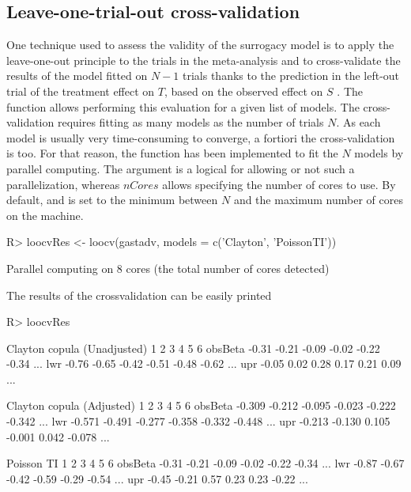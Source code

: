 \documentclass[article,shortnames, nojss]{jss}\usepackage[]{graphicx}\usepackage[]{color}
\begin{document}
\subsection{Leave-one-trial-out cross-validation}
One technique used to assess the validity of the surrogacy model
  is to apply the leave-one-out principle to the trials in the meta-analysis
  and to cross-validate the results of the model fitted on
  $N-1$ trials thanks to the prediction in the left-out trial
  of the treatment effect on $T$, based on the observed effect on $S$
\citep{Michiels09, Mauguen13, Rotolo17}.
The function  allows performing this evaluation for
  a given list of models.
The cross-validation requires fitting as many models as the number of trials $N$.
As each model is usually very time-consuming to converge,
  a fortiori the cross-validation is too.
For that reason, the function  has been implemented to
  fit the $N$ models by parallel computing.
The argument  is a logical for allowing or not such a parallelization,
  whereas $nCores$ allows specifying the number of cores to use.
By default,  and  is set to the minimum
  between $N$ and the maximum number of cores on the machine.
\begin{Schunk}
\begin{Sinput}
R>   loocvRes <- loocv(gastadv, models = c('Clayton', 'PoissonTI'))
\end{Sinput}
\begin{Soutput}
Parallel computing on 8 cores (the total number of cores detected)
\end{Soutput}
\end{Schunk}
The results of the crossvalidation can be easily printed
\begin{Schunk}
\begin{Sinput}
R>   loocvRes
\end{Sinput}
\begin{Soutput}

   Clayton copula (Unadjusted) 
        1     2     3     4     5     6        
obsBeta -0.31 -0.21 -0.09 -0.02 -0.22 -0.34 ...
lwr     -0.76 -0.65 -0.42 -0.51 -0.48 -0.62 ...
upr     -0.05  0.02  0.28  0.17  0.21  0.09 ...

   Clayton copula (Adjusted) 
        1      2      3      4      5      6         
obsBeta -0.309 -0.212 -0.095 -0.023 -0.222 -0.342 ...
lwr     -0.571 -0.491 -0.277 -0.358 -0.332 -0.448 ...
upr     -0.213 -0.130  0.105 -0.001  0.042 -0.078 ...

   Poisson TI 
        1     2     3     4     5     6        
obsBeta -0.31 -0.21 -0.09 -0.02 -0.22 -0.34 ...
lwr     -0.87 -0.67 -0.42 -0.59 -0.29 -0.54 ...
upr     -0.45 -0.21  0.57  0.23  0.23 -0.22 ...
\end{Soutput}
\end{Schunk}
\end{document}
